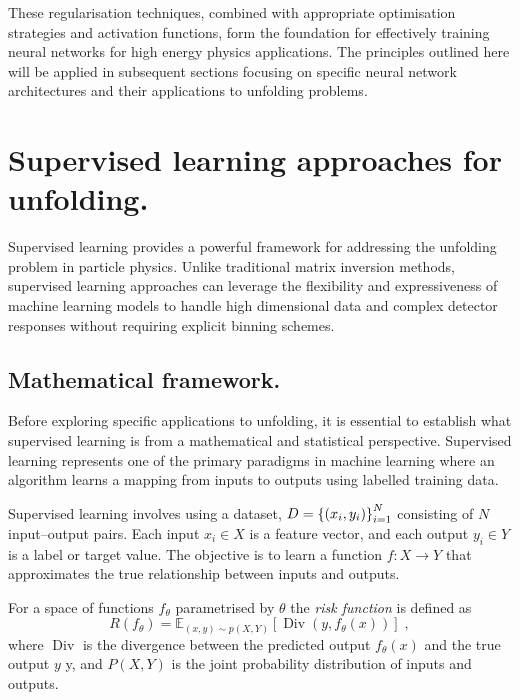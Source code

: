         These regularisation techniques, combined with appropriate optimisation strategies and activation functions, form the foundation for effectively training neural networks for high energy physics applications.
        The principles outlined here will be applied in subsequent sections focusing on specific neural network architectures and their applications to unfolding problems.
        
\section{Supervised learning approaches for unfolding.}
\sectionminitoc

    Supervised learning provides a powerful framework for addressing the unfolding problem in particle physics. 
    Unlike traditional matrix inversion methods, supervised learning approaches can leverage the flexibility and expressiveness of machine learning models to handle high dimensional data and complex detector responses without requiring explicit binning schemes.
    
    \subsection{Mathematical framework.}
    
        Before exploring specific applications to unfolding, it is essential to establish what supervised learning is from a mathematical and statistical perspective.
        Supervised learning represents one of the primary paradigms in machine learning where an algorithm learns a mapping from inputs to outputs using labelled training data.
        
        Supervised learning involves using a dataset, \({D} = \qty{(x_i, y_i)}_{i=1}^{N}\) consisting of \(N\) input--output pairs.
        Each input \(x_i \in {X}\) is a feature vector, and each output \(y_i \in {Y}\) is a label or target value.
        The objective is to learn a function \(f: X \rightarrow Y\) that approximates the true relationship between inputs and outputs.
    
        \begin{definition}
            For a space of functions \(f_\theta\) parametrised by \(\theta\) the \emph{risk function} is defined as 
            \begin{equation}
                {R}(f_\theta) = \mathbb{E}_{(x,y) \sim p(X,Y)}[\operatorname{Div}(y, f_\theta(x))]\;,
            \end{equation}
            where \(\operatorname{Div}\) is the divergence between the predicted output \(f_\theta(x)\) and the true output \(y\) y, and \(P(X,Y)\) is the joint probability distribution of inputs and outputs.
        \end{definition}

